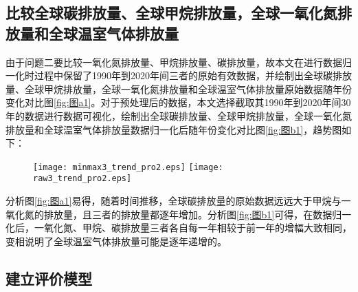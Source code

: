 \documentclass[withoutpreface,bwprint]{cumcmthesis}
\begin{document}
\subsection{比较全球碳排放量、全球甲烷排放量，全球一氧化氮排放量和全球温室气体排放量}
	    由于问题二要比较一氧化氮排放量、甲烷排放量、碳排放量，故本文在进行数据归一化时过程中保留了1990年到2020年间三者的原始有效数据，并绘制出全球碳排放量、全球甲烷排放量，全球一氧化氮排放量和全球温室气体排放量原始数据随年份变化对比图\ref{fig:图a1}。对于预处理后的数据，本文选择截取其1990年到2020年间30年的数据进行数据可视化，绘制出全球碳排放量、全球甲烷排放量，全球一氧化氮排放量和全球温室气体排放量数据归一化后随年份变化对比图\ref{fig:图b1}，趋势图如下：
\begin{figure}[htbp]
	\centering
	\subcaptionbox{\label{fig:图a1}}
	{\texttt{[image: minmax3\_trend\_pro2.eps]}}
	\subcaptionbox{\label{fig:图b1}}
	{\texttt{[image: raw3\_trend\_pro2.eps]}}
\label{fig:双图2}
\end{figure} 

    分析图\ref{fig:图a1}易得，随着时间推移，全球碳排放量的原始数据远远大于甲烷与一氧化氮的排放量，且三者的排放量都逐年增加。分析图\ref{fig:图b1}可得，在数据归一化后，一氧化氮、甲烷、碳排放量三者各自每一年相较于前一年的增幅大致相同，变相说明了全球温室气体排放量可能是逐年递增的。
    
  \subsection{建立评价模型}
\end{document}
